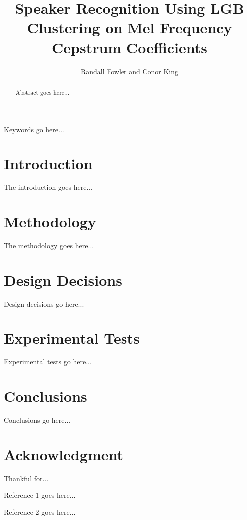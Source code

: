 \documentclass[conference]{IEEEtran}
\begin{document}
\graphicspath{{figures/}} %

\title{Speaker Recognition Using LGB Clustering on Mel Frequency Cepstrum Coefficients}

\author{
    Randall Fowler and Conor King
}

\maketitle

\begin{abstract}
Abstract goes here...
\end{abstract}

\begin{IEEEkeywords}
Keywords go here...
\end{IEEEkeywords}

\section{Introduction}
The introduction goes here...

\section{Methodology}
The methodology goes here...

\section{Design Decisions}
Design decisions go here...

\section{Experimental Tests}
Experimental tests go here...

\section{Conclusions}
Conclusions go here...

\section*{Acknowledgment}
Thankful for...

\begin{thebibliography}{1}
    
    
    Reference 1 goes here...
    
    Reference 2 goes here...
    
\end{thebibliography}
\end{document}
